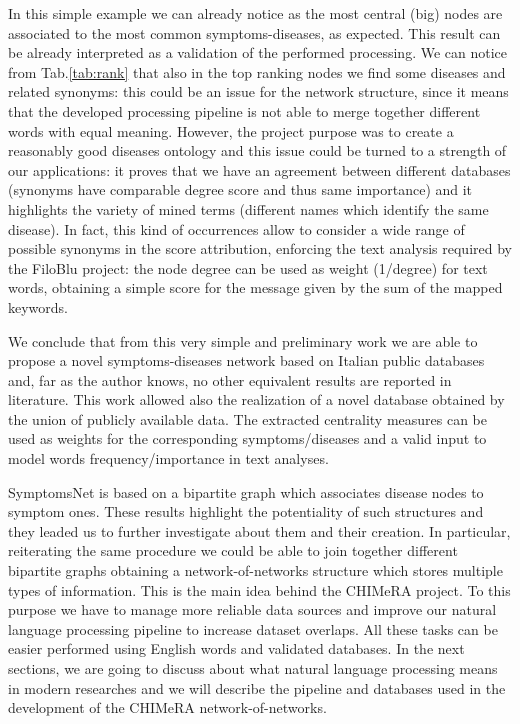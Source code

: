 \documentclass{standalone}
\begin{document}
In this simple example we can already notice as the most central (big) nodes are associated to the most common symptoms-diseases, as expected.
This result can be already interpreted as a validation of the performed processing.
We can notice from Tab.\ref{tab:rank} that also in the top ranking nodes we find some diseases and related synonyms: this could be an issue for the network structure, since it means that the developed processing pipeline is not able to merge together different words with equal meaning.
However, the project purpose was to create a reasonably good diseases ontology and this issue could be turned to a strength of our applications: it proves that we have an agreement between different databases (synonyms have comparable degree score and thus same importance) and it highlights the variety of mined terms (different names which identify the same disease).
In fact, this kind of occurrences allow to consider a wide range of possible synonyms in the score attribution, enforcing the text analysis required by the FiloBlu project: the node degree can be used as weight (1/degree) for text words, obtaining a simple score for the message given by the sum of the mapped keywords.

We conclude that from this very simple and preliminary work we are able to propose a novel symptoms-diseases network based on Italian public databases and, far as the author knows, no other equivalent results are reported in literature.
This work allowed also the realization of a novel database obtained by the union of publicly available data.
The extracted centrality measures can be used as weights for the corresponding symptoms/diseases and a valid input to model words frequency/importance in text analyses.

\textsf{SymptomsNet} is based on a bipartite graph which associates disease nodes to symptom ones.
These results highlight the potentiality of such structures and they leaded us to further investigate about them and their creation.
In particular, reiterating the same procedure we could be able to join together different bipartite graphs obtaining a network-of-networks structure which stores multiple types of information.
This is the main idea behind the \textsf{CHIMeRA} project.
To this purpose we have to manage more reliable data sources and improve our natural language processing pipeline to increase dataset overlaps.
All these tasks can be easier performed using English words and validated databases.
In the next sections, we are going to discuss about what natural language processing means in modern researches and we will describe the pipeline and databases used in the development of the \textsf{CHIMeRA} network-of-networks.
\end{document}
